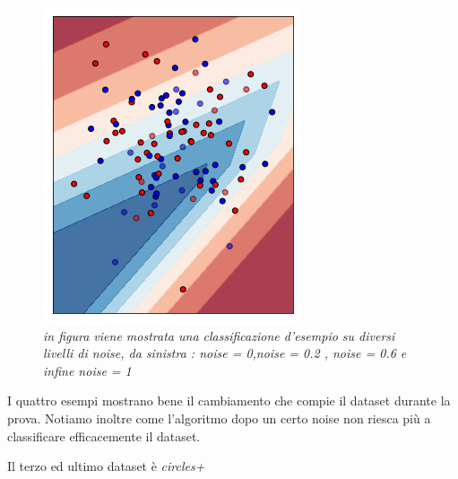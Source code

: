 \documentclass[12pt,a4paper]{report}
\begin{document}
\begin{figure}[H]
 \includegraphics[scale = 0.35]{images/circles-noise1.png}
 \caption{\textit{in figura viene mostrata una classificazione d'esempio su diversi livelli di noise, da sinistra : noise = 0,noise = 0.2 , noise = 0.6 e infine noise = 1}}
 \label{exnoisecircles}
\end{figure}

I quattro esempi mostrano bene il cambiamento che compie il dataset durante la prova.
Notiamo inoltre come l'algoritmo dopo un certo noise non riesca più a classificare efficacemente il dataset.

\newpage

Il terzo ed ultimo dataset è \textit{circles+}
\end{document}
